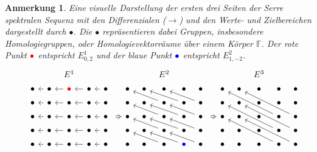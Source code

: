\documentclass[12pt, hidelinks]{article}
\numberwithin{conj}{section}
\newtheorem{remark}[conj]{Anmerkung}
\begin{document}
\begin{remark}
Eine visuelle Darstellung der ersten drei Seiten der Serre spektralen Sequenz mit den Differenzialen ($\rightarrow$) und den Werte- und Zielbereichen dargestellt durch $\bullet$. Die $\bullet$ repräsentieren dabei Gruppen, insbesondere Homologiegruppen, oder Homologievektorräume über einem Körper $\mathbb{F}$. Der rote Punkt $\color{red}\bullet$ entspricht $E^1_{0,2}$ und der blaue Punkt $\color{blue}\bullet$ entspricht $E^2_{1,-2}$.
\[
\begin{tikzcd}[sep=tiny]
    &&& {E^1} &&&&&& {E^2} &&&&&& {E^3} \\
    & \bullet & \bullet & {\color{red}\bullet} & \bullet & \bullet && \bullet & \bullet & \bullet & \bullet & \bullet && \bullet & \bullet & \bullet & \bullet & \bullet \\
    {} & \bullet & \bullet & \bullet & \bullet & \bullet && \bullet & \bullet & \bullet & \bullet & \bullet && \bullet & \bullet & \bullet & \bullet & \bullet \\
    & \bullet & \bullet & \bullet & \bullet & \bullet && \bullet & \bullet & \bullet & \bullet & \bullet && \bullet & \bullet & \bullet & \bullet & \bullet \\
    & \bullet & \bullet & \bullet & \bullet & \bullet && \bullet & \bullet & \bullet & \bullet & \bullet && \bullet & \bullet & \bullet & \bullet & \bullet \\
    & \bullet & \bullet & \bullet & \bullet & \bullet && \bullet & \bullet & \bullet & {\color{blue}\bullet} & \bullet && \bullet & \bullet & \bullet & \bullet & \bullet
    \arrow[from=2-3, to=2-2]
    \arrow[from=2-4, to=2-3]
    \arrow[from=2-5, to=2-4]
    \arrow[from=2-6, to=2-5]
    \arrow[from=3-3, to=3-2]
    \arrow[from=3-4, to=3-3]
    \arrow[from=3-5, to=3-4]
    \arrow[from=3-6, to=3-5]
    \arrow[from=3-10, to=2-8]
    \arrow[from=3-11, to=2-9]
    \arrow[from=3-12, to=2-10]
    \arrow[from=4-3, to=4-2]
    \arrow[from=4-4, to=4-3]
    \arrow[from=4-5, to=4-4]
    \arrow[from=4-6, to=4-5]
    \arrow[shorten <=5pt, Rightarrow, from=4-6, to=4-8]
    \arrow[from=4-10, to=3-8]
    \arrow[from=4-11, to=3-9]
    \arrow[from=4-12, to=3-10]
    \arrow[shorten <=5pt, Rightarrow, from=4-12, to=4-14]
    \arrow[from=4-17, to=2-14]
    \arrow[from=4-18, to=2-15]
    \arrow[from=5-3, to=5-2]
    \arrow[from=5-4, to=5-3]
    \arrow[from=5-5, to=5-4]
    \arrow[from=5-6, to=5-5]
    \arrow[from=5-10, to=4-8]
    \arrow[from=5-11, to=4-9]
    \arrow[from=5-12, to=4-10]
    \arrow[from=5-17, to=3-14]
    \arrow[from=5-18, to=3-15]
    \arrow[from=6-3, to=6-2]
    \arrow[from=6-4, to=6-3]
    \arrow[from=6-5, to=6-4]
    \arrow[from=6-6, to=6-5]
    \arrow[from=6-10, to=5-8]
    \arrow[from=6-11, to=5-9]
    \arrow[from=6-12, to=5-10]
    \arrow[from=6-17, to=4-14]
    \arrow[from=6-18, to=4-15]
\end{tikzcd}
\]
\end{remark}
\end{document}
